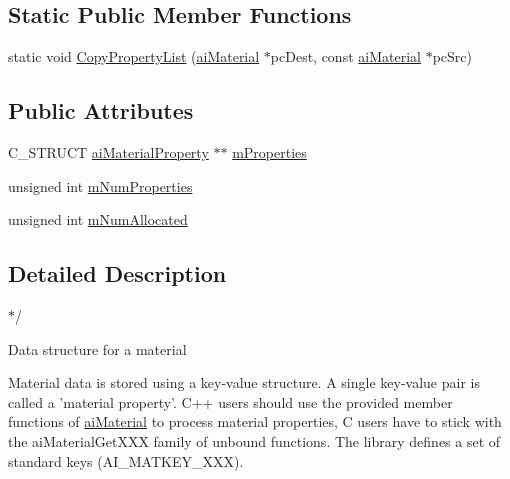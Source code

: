 \subsection*{Static Public Member Functions}
\begin{DoxyCompactItemize}
\item 
static void \hyperlink{structendif_af2407ec9a1f919efc36017bb1c414841}{Copy\+Property\+List} (\hyperlink{classai_material}{ai\+Material} $\ast$pc\+Dest, const \hyperlink{classai_material}{ai\+Material} $\ast$pc\+Src)
\end{DoxyCompactItemize}
\subsection*{Public Attributes}
\begin{DoxyCompactItemize}
\item 
C\+\_\+\+S\+T\+R\+U\+C\+T \hyperlink{classai_material_property}{ai\+Material\+Property} $\ast$$\ast$ \hyperlink{structendif_a95295db8cbd37f02553457d84d65068a}{m\+Properties}
\item 
unsigned int \hyperlink{structendif_a751ff065f0b034cfd9cd08d7bc41d668}{m\+Num\+Properties}
\item 
unsigned int \hyperlink{structendif_add50ca52ed05564f2187b9893fb1f584}{m\+Num\+Allocated}
\end{DoxyCompactItemize}


\subsection{Detailed Description}
$\ast$/ 

Data structure for a material

Material data is stored using a key-\/value structure. A single key-\/value pair is called a 'material property'. C++ users should use the provided member functions of \hyperlink{classai_material}{ai\+Material} to process material properties, C users have to stick with the ai\+Material\+Get\+X\+X\+X family of unbound functions. The library defines a set of standard keys (A\+I\+\_\+\+M\+A\+T\+K\+E\+Y\+\_\+\+X\+X\+X). 

